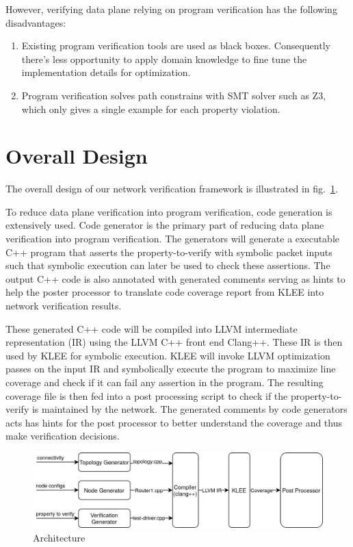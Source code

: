 \documentclass[letterpaper, 10 pt, conference]{ieeeconf}  %
\begin{document}
However, verifying data plane relying on program verification has the following disadvantages:

\begin{enumerate}
 \item Existing program verification tools are used as black boxes. Consequently there's less opportunity to apply domain knowledge to fine tune the implementation details for optimization.
 \item Program verification solves path constrains with SMT solver such as Z3, which only gives a single example for each property violation.
\end{enumerate}

\section{Overall Design}\label{sec:overall}
The overall design of our network verification framework is illustrated in fig.~\ref{fig:arch}. 

To reduce data plane verification into program verification, code generation is extensively used. 
Code generator is the primary part of reducing data plane verification into program verification. 
The generators will generate a executable C++ program that asserts the property-to-verify with symbolic packet inputs such that symbolic execution can later be used to check these assertions. 
The output C++ code is also annotated with generated comments serving as hints to help the poster processor to translate code coverage report from KLEE into network verification results.

These generated C++ code will be compiled into LLVM intermediate representation (IR) using the LLVM C++ front end Clang++. 
These IR is then used by KLEE for symbolic execution. KLEE will invoke LLVM optimization passes on the input IR and symbolically execute the program to maximize line coverage and check if it can fail any assertion in the program. 
The resulting coverage file is then fed into a post processing script to check if the property-to-verify is maintained by the network. 
The generated comments by code generators acts has hints for the post processor to better understand the coverage and thus make verification decisions.

\begin{figure}[]
  \centering
  \includegraphics[width=\linewidth]{overview.png}
  \caption{Architecture}
  \label{fig:arch}
\end{figure}
\end{document}
